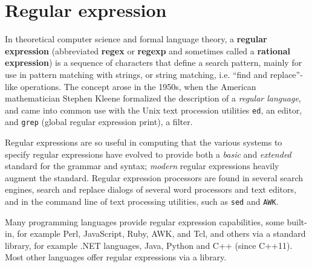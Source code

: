 \chapter{Regular expression}
\label{chap:intro}

In \textsf{theoretical computer science} and \textsf{formal language
  theory}, a \textbf{regular expression} (abbreviated \textbf{regex}
or \textbf{regexp} and sometimes called a \textbf{rational
  expression}) is a sequence of characters that define a search
pattern, mainly for use in pattern matching with strings, or string
matching, i.e. ``find and replace''-like operations. The concept arose
in the 1950s, when the American mathematician Stephen Kleene
formalized the description of a \textsl{regular language}, and came
into common use with the Unix text procession utilities \verb|ed|, an
editor, and \verb|grep| (global regular expression print), a filter.

Regular expressions are so useful in computing that the various
systems to specify regular expressions have evolved to provide both a
\textsl{basic} and \textsl{extended} standard for the grammar and
syntax; \textsl{modern} regular expressions heavily augment the
standard. Regular expression processors are found in several search
engines, search and replace dialogs of several word processors and
text editors, and in the command line of text processing utilities,
such as \verb|sed| and \verb|AWK|.

Many programming languages provide regular expression capabilities,
some built-in, for example Perl, JavaScript, Ruby, AWK, and Tcl, and
others via a standard library, for example .NET languages, Java,
Python and C++ (since C++11). Most other languages offer regular
expressions via a library.

